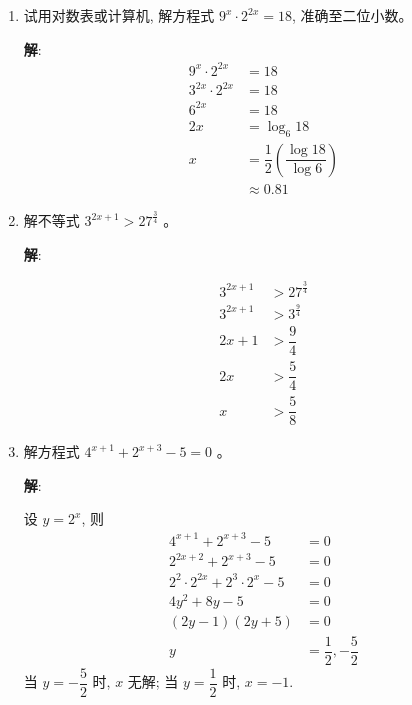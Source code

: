 \documentclass{report}
\newcommand{\sol}{\vspace{0.2cm}\textbf{解}:}
\begin{document}
\begin{multicols*}{2}
\begin{enumerate}[leftmargin=*]
        \item 试用对数表或计算机, 解方程式 $9^x \cdot 2^{2 x}=18$, 准确至二位小数。

              \sol{}
              \begin{align*}
                  9^x \cdot 2^{2 x}   & = 18                                               \\
                  3^{2x} \cdot 2^{2x} & = 18                                               \\
                  6^{2x}              & = 18                                               \\
                  2x                  & = \log_6 18                                        \\
                  x                   & = \dfrac{1}{2}\left(\dfrac{\log 18}{\log 6}\right) \\
                                      & \approx 0.81
              \end{align*}

        \item 解不等式 $3^{2 x+1}>27^{\frac{3}{4}}$ 。

              \sol{}

              \begin{align*}
                  3^{2 x+1} & > 27^{\frac{3}{4}} \\
                  3^{2 x+1} & > 3^{\frac{9}{4}}  \\
                  2x + 1    & > \dfrac{9}{4}     \\
                  2x        & > \dfrac{5}{4}     \\
                  x         & > \dfrac{5}{8}
              \end{align*}

        \item 解方程式 $4^{x+1}+2^{x+3}-5=0$ 。

              \sol{}

              设 $y = 2^x$, 则
              \begin{align*}
                  4^{x+1} + 2^{x+3} - 5                & = 0                           \\
                  2^{2x+2} + 2^{x+3} - 5               & = 0                           \\
                  2^2 \cdot 2^{2x} + 2^3 \cdot 2^x - 5 & = 0                           \\
                  4y^2 + 8y - 5                        & = 0                           \\
                  (2y - 1)(2y + 5)                     & = 0                           \\
                  y                                    & = \dfrac{1}{2}, -\dfrac{5}{2}
              \end{align*}
              当 $y = -\dfrac{5}{2}$ 时, $x$ 无解; 当 $y = \dfrac{1}{2}$ 时, $x = -1$.


\end{enumerate}
\end{multicols*}
\end{document}
